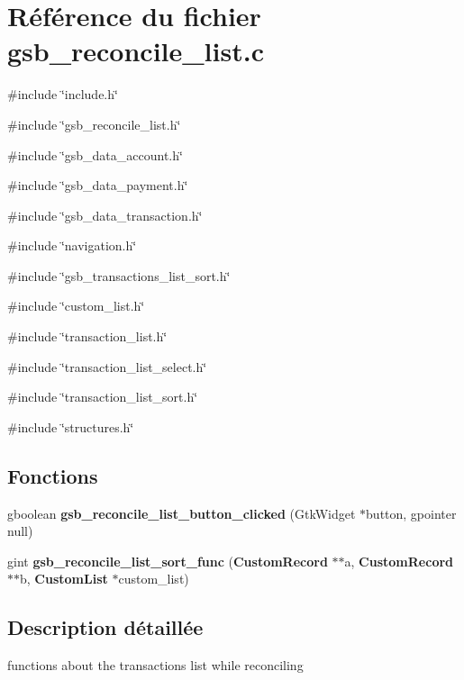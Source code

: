 \section{Référence du fichier gsb\_\-reconcile\_\-list.c}
\label{gsb__reconcile__list_8c}
{\ttfamily \#include \char`\"{}include.h\char`\"{}}\par
{\ttfamily \#include \char`\"{}gsb\_\-reconcile\_\-list.h\char`\"{}}\par
{\ttfamily \#include \char`\"{}gsb\_\-data\_\-account.h\char`\"{}}\par
{\ttfamily \#include \char`\"{}gsb\_\-data\_\-payment.h\char`\"{}}\par
{\ttfamily \#include \char`\"{}gsb\_\-data\_\-transaction.h\char`\"{}}\par
{\ttfamily \#include \char`\"{}navigation.h\char`\"{}}\par
{\ttfamily \#include \char`\"{}gsb\_\-transactions\_\-list\_\-sort.h\char`\"{}}\par
{\ttfamily \#include \char`\"{}custom\_\-list.h\char`\"{}}\par
{\ttfamily \#include \char`\"{}transaction\_\-list.h\char`\"{}}\par
{\ttfamily \#include \char`\"{}transaction\_\-list\_\-select.h\char`\"{}}\par
{\ttfamily \#include \char`\"{}transaction\_\-list\_\-sort.h\char`\"{}}\par
{\ttfamily \#include \char`\"{}structures.h\char`\"{}}\par
\subsection*{Fonctions}
\begin{DoxyCompactItemize}
\item 
gboolean {\bf gsb\_\-reconcile\_\-list\_\-button\_\-clicked} (GtkWidget $\ast$button, gpointer null)
\item 
gint {\bf gsb\_\-reconcile\_\-list\_\-sort\_\-func} ({\bf CustomRecord} $\ast$$\ast$a, {\bf CustomRecord} $\ast$$\ast$b, {\bf CustomList} $\ast$custom\_\-list)
\end{DoxyCompactItemize}


\subsection{Description détaillée}
functions about the transactions list while reconciling 

